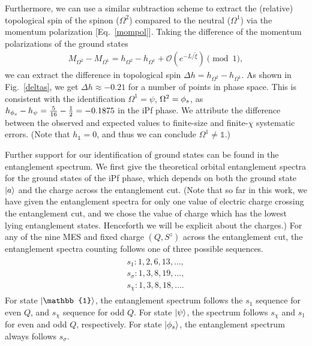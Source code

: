 Furthermore, we can use a similar subtraction scheme to extract the (relative) topological spin of the spinon ($\Omega^2$) compared to the neutral ($\Omega^1$) via the momentum polarization [Eq.~\eqref{mompol}].
Taking the difference of the momentum polarizations of the ground states
\begin{align}
	M_{\Omega^2} - M_{\Omega^1} = h_{\Omega^2} - h_{\Omega^1} + \mathcal{O}(e^{-L/\tilde{\xi}}) \pmod{1} ,
\end{align}
we can extract the difference in topological spin $\Delta h = h_{\Omega^2} - h_{\Omega^1}$.
As shown in Fig.~\ref{deltas}, we get $\Delta h \approx -0.21$ for a number of points in phase space.
This is consistent with the identification $\Omega^1 = \psi$, $\Omega^2 = {\phi_s}$, as $h_{\phi_s} - h_\psi = \frac{5}{16} - \frac{1}{2}  = -0.1875$ in the iPf phase. We attribute the difference between the observed and expected values to finite-size and finite-$\chi$ systematic errors.
(Note that $h_{\mathbb{1}} = 0$, and thus we can conclude $\Omega^1 \neq \mathbb{1}$.)


Further support for our identification of ground states can be found in the entanglement spectrum.
We first give the theoretical orbital entanglement spectra for the ground states of the iPf phase, which depends on both the ground state $\ket{a}$ and the charge across the entanglement cut.
(Note that so far in this work, we have given the entanglement spectra for only one value of electric charge crossing the entanglement cut, and we chose the value of charge which has the lowest lying entanglement states.  Henceforth we will be explicit about the charges.)
For any of the nine MES and fixed charge $(Q,S^z)$ across the entanglement cut, the entanglement spectra counting follows one of three possible sequences.
\begin{align}\begin{split}
	s_1: 1, 2, 6, 13, \dots,
\\	s_\sigma: 1, 3, 8, 19, \dots,
\\	s_\chi: 1, 3, 8, 18, \dots.
\end{split}\end{align}
For state $\ket{\mathbb{1}}$, the entanglement spectrum follows the $s_1$ sequence for even $Q$, and $s_\chi$ sequence for odd $Q$.
For state $\ket{\psi}$, the spectrum follows $s_\chi$ and $s_1$ for even and odd $Q$, respectively.
For state $\ket{{\phi_s}}$, the entanglement spectrum always follows $s_\sigma$.



